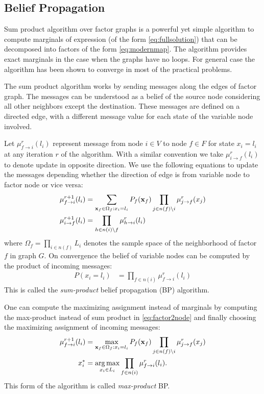 \documentclass[letterpaper, 10 pt, conference]{ieeeconf} %
\DeclareMathOperator*{\argmax}{arg\,max}
\begin{document}
\subsection{Belief Propagation}
\newcommand{\bpmsg}[4]{\mu^{#4}_{#1\rightarrow#2}(#3)}
Sum product algorithm over factor graphs \cite{kschischang2001factor} is a
powerful yet simple algorithm to compute marginals  of
expression (of the form \eqref{eq:fullsolution}) that can be decomposed into
factors of the form \eqref{eq:modernmap}. The algorithm provides exact
marginals in the case when the graphs have no loops. For general case the
algorithm has been shown %
to converge in most of the practical problems.
 
The sum product algorithm works by sending messages along the edges of factor
graph. The messages can be understood as a belief of the source node
considering all other neighbors except the destination. These messages are
defined on a directed edge, with a different message value for each state of
the variable node involved. 

Let $\bpmsg{f}{i}{l_i}{r}$ represent message from
node $i \in V$ to node $f \in F$ for state $x_i = l_i$ at any iteration $r$ of the
algorithm. With a similar convention we take $\bpmsg{i}{f}{l_i}{r}$ to denote
update in opposite direction. We use the following equations to update the messages depending whether the direction of edge is from variable node to factor node or vice versa:
\begin{align}
  \bpmsg{f}{i}{l_i}{r+1} &= \sum_{\map_f \in \Omega_f: x_i = l_i}P_f(\map_f)\prod_{j \in n(f) \setminus i}\bpmsg{j}{f}{x_j}{r}
  \label{eq:factor2node}
  \\
  \bpmsg{i}{f}{l_i}{r+1} &= \prod_{h \in n(i) \setminus f}\bpmsg{h}{i}{l_i}{r}
  \label{eq:node2factor}
\end{align}
where $\Omega_f = \prod_{i \in n(f)} L_i$ denotes the sample space of the
neighborhood of factor $f$ in graph $G$. On convergence the belief of variable
nodes can be computed by the product of incoming messages:
\begin{align}
  P(x_i = l_i) &= \prod_{f \in n(i)}\bpmsg{f}{i}{l_i}{r}
\end{align}
This is called the \emph{sum-product} belief propagation (BP) algorithm.

One can compute the maximizing assignment instead of marginals by computing
the max-product instead of sum product in \eqref{eq:factor2node} and finally 
choosing the maximizing assignment of incoming messages:
\begin{align}
  \bpmsg{f}{i}{l_i}{r+1} &= \max_{\map_f \in \Omega_f: x_i =
l_i}P_f(\map_f)\prod_{j \in n(f) \setminus i}\bpmsg{j}{f}{x_j}{r}\\
x_i^* &= \argmax_{x_i \in L_i} \prod_{f \in n(i)}\bpmsg{f}{i}{l_i}{r}.
\end{align}
This form of the algorithm is called \emph{max-product} BP.
\end{document}
